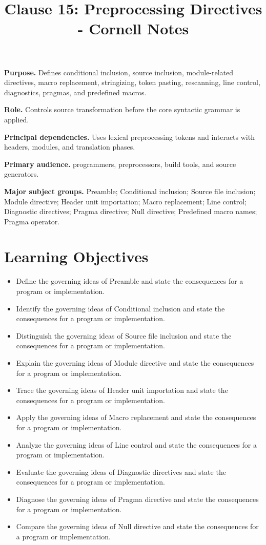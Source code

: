 \documentclass[11pt,letterpaper]{article}
\title{Clause 15: Preprocessing Directives - Cornell Notes}
\author{}
\date{}
\begin{document}
\maketitle
\begin{CornellReferenceOrientationBox}
\textbf{Purpose.} Defines conditional inclusion, source inclusion, module-related directives, macro replacement, stringizing, token pasting, rescanning, line control, diagnostics, pragmas, and predefined macros.
\par\textbf{Role.} Controls source transformation before the core syntactic grammar is applied.
\par\textbf{Principal dependencies.} Uses lexical preprocessing tokens and interacts with headers, modules, and translation phases.
\par\textbf{Primary audience.} programmers, preprocessors, build tools, and source generators.
\par\textbf{Major subject groups.} Preamble; Conditional inclusion; Source file inclusion; Module directive; Header unit importation; Macro replacement; Line control; Diagnostic directives; Pragma directive; Null directive; Predefined macro names; Pragma operator.
\end{CornellReferenceOrientationBox}
\section{Learning Objectives}
\begin{itemize}[label=\textcolor{CornellReferenceTeal}{$\blacktriangleright$}]
\item Define the governing ideas of Preamble and state the consequences for a program or implementation.
\item Identify the governing ideas of Conditional inclusion and state the consequences for a program or implementation.
\item Distinguish the governing ideas of Source file inclusion and state the consequences for a program or implementation.
\item Explain the governing ideas of Module directive and state the consequences for a program or implementation.
\item Trace the governing ideas of Header unit importation and state the consequences for a program or implementation.
\item Apply the governing ideas of Macro replacement and state the consequences for a program or implementation.
\item Analyze the governing ideas of Line control and state the consequences for a program or implementation.
\item Evaluate the governing ideas of Diagnostic directives and state the consequences for a program or implementation.
\item Diagnose the governing ideas of Pragma directive and state the consequences for a program or implementation.
\item Compare the governing ideas of Null directive and state the consequences for a program or implementation.
\end{itemize}
\end{document}
